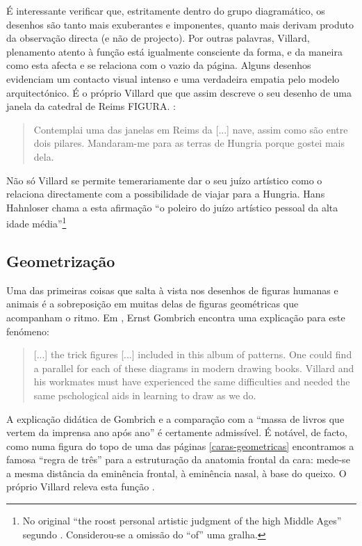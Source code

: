 \documentclass{article}
\begin{document}
É interessante verificar que, estritamente dentro do grupo
diagramático, os desenhos são tanto mais exuberantes e imponentes,
quanto mais derivam produto da observação directa (e não de
projecto). Por outras palavras, Villard, plenamento atento à função
está igualmente consciente da forma, e da maneira como esta afecta e
se relaciona com o vazio da página. Alguns desenhos evidenciam um
contacto visual intenso e uma verdadeira empatia pelo modelo
arquitectónico. É o próprio Villard que que assim descreve o seu
desenho de uma janela da catedral de Reims
FIGURA. \cite[p. ??]{villard}:

\begin{quote}
Contemplai uma das janelas em Reims da [...] nave, assim como são
entre dois pilares. Mandaram-me para as terras de Hungria porque
gostei mais dela. \cite[p. ??]{villard}
\end{quote}

Não só Villard se permite temerariamente dar o seu juízo artístico
como o relaciona directamente com a possibilidade de viajar para a
Hungria. Hans Hahnloser \cite[p. ??]{hahnloser} chama a esta afirmação
``o poleiro do juízo artístico pessoal da alta idade
média''\footnote{No original ``the roost personal artistic judgment of
  the high Middle Ages'' segundo \cite{teresa}. Considerou-se a
  omissão do ``of'' uma gralha.}

\subsection{Geometrização}

Uma das primeiras coisas que salta à vista nos desenhos de figuras
humanas e animais é a sobreposição em muitas delas de figuras
geométricas que acompanham o ritmo. Em \cite[p. 130]{gombrich}, Ernst
Gombrich encontra uma explicação para este fenómeno:

\begin{quote}
  [...] the trick figures [...] included in this album of patterns. One
  could find a parallel for each of these diagrams in modern drawing
  books. Villard and his workmates must have experienced the same
  difficulties and needed the same pschological aids in learning to
  draw as we do.
\end{quote}

A explicação didática de Gombrich e a comparação com a ``massa de
livros que vertem da imprensa ano após ano'' \cite[p. 127]{gombrich} é
certamente admissível. É notável, de facto, como numa figura do topo
de uma das páginas \ref{caras-geometricas} encontramos a famosa
``regra de três'' para a estruturação da anatomia frontal da cara:
mede-se a mesma distância da eminência frontal, à eminência nasal, à
base do queixo. O próprio Villard releva esta função \cite[p. 18,
  verso]{villard}.
\end{document}
